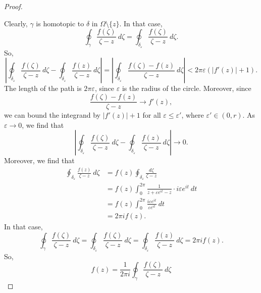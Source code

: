 \documentclass[a4paper, openany]{memoir}
\theoremstyle{definition}
\theoremstyle{plain}
\begin{document}
\begin{proof}
\begin{figure}[H]
\end{figure}
\noindent Clearly, $\gamma$ is homotopic to $\delta$ in $\Omega \setminus \{z\}$. In that case,
\[\oint_\gamma \frac{f(\zeta)}{\zeta - z} \ d\zeta = \oint_{\delta_\varepsilon} \frac{f(\zeta)}{\zeta - z} \ d\zeta.\]
So,
\[\left|\oint_{\delta_\varepsilon} \frac{f(\zeta)}{\zeta - z} \ d\zeta - \oint_{\delta_\varepsilon} \frac{f(z)}{\zeta - z} \ d\zeta\right| = \left|\oint_{\delta_\varepsilon} \frac{f(\zeta) - f(z)}{\zeta - z} \ d\zeta\right| < 2\pi \varepsilon (|f'(z)| + 1).\]
The length of the path is $2\pi \varepsilon$, since $\varepsilon$ is the radius of the circle. Moreover, since
\[\frac{f(\zeta) - f(z)}{\zeta - z} \to f'(z),\]
we can bound the integrand by $|f'(z)| + 1$ for all $\varepsilon \leq \varepsilon'$, where $\varepsilon' \in (0, r)$. As $\varepsilon \to 0$, we find that
\[\left|\oint_{\delta_\varepsilon} \frac{f(\zeta)}{\zeta - z} \ d\zeta - \oint_{\delta_\varepsilon} \frac{f(z)}{\zeta - z} \ d\zeta\right| \to 0.\]
Moreover, we find that
\begin{align*}
    \oint_{\delta_\varepsilon} \frac{f(z)}{\zeta - z} \ d\zeta &= f(z) \oint_{\delta_\varepsilon} \frac{d\zeta}{\zeta - z} \\
    &= f(z) \int_0^{2\pi} \frac{1}{z + \varepsilon e^{it} - z} \cdot i \varepsilon e^{it} \ dt \\
    &= f(z) \int_0^{2\pi} \frac{i \varepsilon e^{it}}{\varepsilon e^{it}} \ dt \\
    &= 2\pi i f(z).
\end{align*}
In that case,
\[\oint_\gamma \frac{f(\zeta)}{\zeta - z} \ d\zeta = \oint_{\delta_\varepsilon} \frac{f(\zeta)}{\zeta - z} \ d\zeta = \oint_{\delta_\varepsilon} \frac{f(z)}{\zeta - z} \ d\zeta = 2\pi i f(z).\]
So,
\[f(z) = \frac{1}{2\pi i} \oint_\gamma \frac{f(\zeta)}{\zeta - z} \ d\zeta\]
\end{proof}
\end{document}
